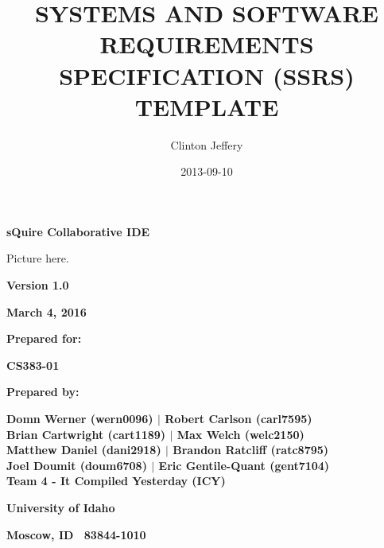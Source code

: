 \documentclass[twoside,letterpaper]{article}
\title{SYSTEMS AND SOFTWARE REQUIREMENTS SPECIFICATION (SSRS) TEMPLATE}
\author{Clinton Jeffery}
\date{2013-09-10}
\begin{document}
\clearpage\setcounter{page}{1}\pagestyle{Standard}




\bigskip

{\centering\bfseries
sQuire Collaborative IDE
\par}


\bigskip


\bigskip


\bigskip

\begin{center}
Picture here.
\end{center}

\bigskip


\bigskip

{\centering\bfseries
Version 1.0
\par}

{\centering\bfseries
March 4, 2016
\par}


\bigskip


\bigskip

{\centering\bfseries
Prepared for:
\par}

{\centering\bfseries
CS383-01
\par}


\bigskip


\bigskip

{\centering\bfseries
Prepared by:
\par}

{\centering\bfseries
Domn Werner (wern0096) $\vert$ Robert Carlson (carl7595) \\ Brian Cartwright (cart1189) $\vert$ Max Welch (welc2150) \\ Matthew Daniel (dani2918) $\vert$ Brandon Ratcliff (ratc8795) \\ Joel Doumit (doum6708) $\vert$ Eric Gentile-Quant (gent7104) \\
Team 4 - It Compiled Yesterday (ICY)
\par}

{\centering\bfseries
University of Idaho
\par}

{\centering\bfseries
Moscow, ID \ 83844-1010
\par}

\end{document}
